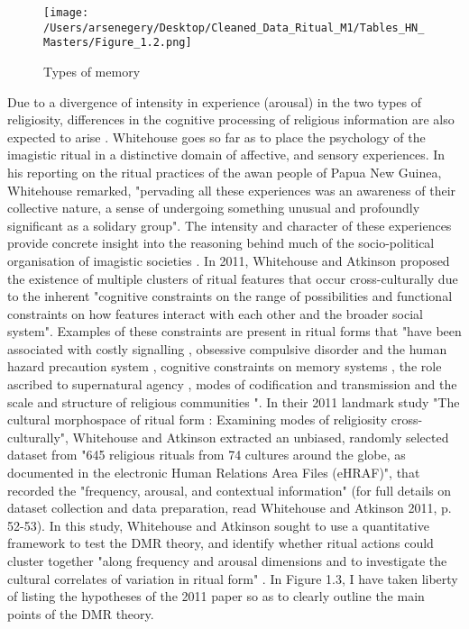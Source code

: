 \documentclass[12pt]{report}
\begin{document}
	\begin{figure}[htbp]
		\centering
		\texttt{[image: /Users/arsenegery/Desktop/Cleaned\_Data\_Ritual\_M1/Tables\_HN\_Masters/Figure\_1.2.png]} %
		\caption{Types of memory \cite{whitehouse2004modes}}
		\label{fig:table2}
	\end{figure}

	\noindent Due to a divergence of intensity in experience (arousal) in the two types of religiosity, differences in the cognitive processing of religious information are also expected to arise \cite{boyer2023naturalness}\cite{boyer2007religion}\cite{whitehouse2007}\cite{whitehouse2002}\cite{whitehouse2004modes}. Whitehouse goes so far as to place the psychology of the imagistic ritual in a distinctive domain of affective, and sensory experiences. In his reporting on the ritual practices of the awan people of Papua New Guinea, Whitehouse remarked, "pervading all these experiences was an awareness of their collective nature, a sense of undergoing something unusual and profoundly significant as a solidary group"\cite{whitehouse2002}. The intensity and character of these experiences provide concrete insight into the reasoning behind much of the socio-political organisation of imagistic societies \cite{boyer1993cognitive}\cite{whitehouse2005}. In 2011, Whitehouse and Atkinson \cite{atkinson2011} proposed the existence of multiple clusters of ritual features that occur cross-culturally due to the inherent "cognitive constraints on the range of possibilities and functional constraints on how features interact with each other and the broader social system". Examples of these constraints are present in ritual forms that "have been associated with costly signalling \cite{irons2001religion}\cite{sosis2003signaling}\cite{sosis2007scars}, obsessive compulsive disorder and the human hazard precaution system \cite{lienard2006}, cognitive constraints on memory systems \cite{whitehouse1992}, the role ascribed to supernatural agency \cite{mccauley2002}\cite{littlewood2005}, modes of codification and transmission \cite{barth1990}\cite{turner1974} and the scale and structure of religious communities \cite{whitehouse2000}". In their 2011 landmark study "The cultural morphospace of ritual form : Examining modes of religiosity cross-culturally", Whitehouse and Atkinson \cite{atkinson2011} extracted an unbiased, randomly selected dataset from "645 religious rituals from 74 cultures around the globe, as documented in the electronic Human Relations Area Files (eHRAF)", that recorded the "frequency, arousal, and contextual information" \cite{atkinson2011} (for full details on dataset collection and data preparation, read Whitehouse and Atkinson 2011, p. 52-53). In this study, Whitehouse and Atkinson sought to use a quantitative framework to test the DMR theory, and identify whether ritual actions could cluster together "along frequency and arousal dimensions and to investigate the cultural correlates of variation in ritual form" \cite{atkinson2011}. In Figure 1.3, I have taken liberty of listing the hypotheses of the 2011 paper so as to clearly outline the main points of the DMR theory.\\
	
\end{document}

